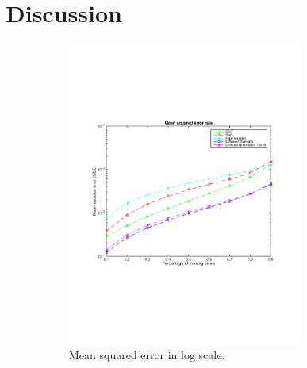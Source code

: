 \section{Discussion}
\label{sec:discussion}

\begin{figure}
	\centering
	\begin{subfigure}[b]{0.49\textwidth}
		\centering
		\includegraphics[clip, trim=2cm 7cm 2cm 6cm, width=0.85\textwidth]{figures/mse_vector}
		\caption{Mean squared error in log scale.}
		\label{fig:err_random}
	\end{subfigure}
	\begin{subfigure}[b]{0.49\textwidth}
		\centering

\end{subfigure}
\end{figure}

